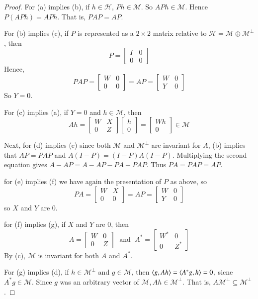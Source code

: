 \begin{proof}
    For (a) implies (b), if $h \in \mathscr{H}$, $Ph \in \mathscr{M}$. So $APh \in \mathscr{M}$. Hence $P(APh) = APh$. That is, $PAP = AP$.

    For (b) implies (c), if $P$ is represented as a $2\times 2$ matrix relative to $\mathscr{H} = \mathscr{M}\oplus \mathscr{M}^{\perp}$, then $$P = \begin{bmatrix} I & 0 \\ 0 & 0 \end{bmatrix}$$
    Hence, $$PAP = \begin{bmatrix} W & 0 \\ 0 & 0 \end{bmatrix} = AP = \begin{bmatrix} W & 0 \\ Y & 0 \end{bmatrix}$$
    So $Y = 0$.

    For (c) implies (a), if $Y = 0$ and $h \in \mathscr{M}$, then $$Ah = \begin{bmatrix} W & X \\ 0 & Z\end{bmatrix}\begin{bmatrix} h \\ 0 \end{bmatrix} = \begin{bmatrix} Wh \\ 0 \end{bmatrix} \in \mathscr{M}$$


    Next, for (d) implies (e) since both $\mathscr{M}$ and $\mathscr{M}^{\perp}$ are invariant for $A$, (b) implies that $AP = PAP$ and $A(I-P) = (I-P)A(I-P)$. Multiplying the second equation gives $A-AP = A-AP-PA+PAP$. Thus $PA = PAP = AP$.

    for (e) implies (f) we have again the presentation of $P$ as above, so $$PA = \begin{bmatrix} W & X \\ 0 & 0 \end{bmatrix} = AP = \begin{bmatrix} W & 0 \\ Y & 0 \end{bmatrix}$$
    so $X$ and $Y$ are $0$.

    for (f) implies (g), if $X$ and $Y$ are $0$, then $$A = \begin{bmatrix} W & 0 \\ 0 & Z \end{bmatrix} \;\text{ and }\;A^* = \begin{bmatrix} W^* & 0 \\ 0 & Z^* \end{bmatrix}$$
    By (c), $\mathscr{M}$ is invariant for both $A$ and $A^*$.

    For (g) implies (d), if $h \in \mathscr{M}^{\perp}$ and $g \in \mathscr{M}$, then $\left\langle g, Ah\right\rangle = \left\langle A^*g, h\right\rangle = 0$, sicne $A^*g \in \mathscr{M}$. Since $g$ was an arbitrary vector of $\mathscr{M}, Ah \in \mathscr{M}^{\perp}$. That is, $A\mathscr{M}^{\perp} \subseteq\mathscr{M}^{\perp}$.
\end{proof}

